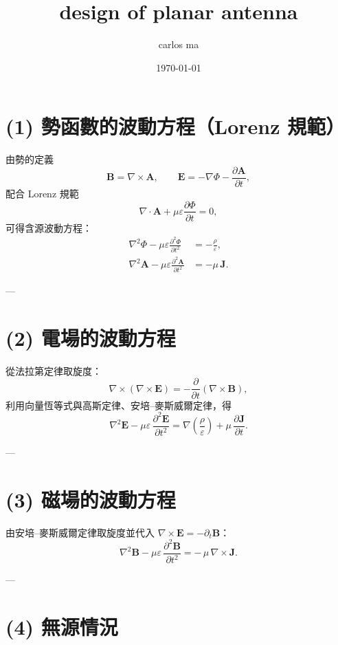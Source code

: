 \documentclass{article}
\title{design of planar antenna}
\author{carlos ma}
\date{\today}
\begin{document}
\maketitle
\section*{(1) 勢函數的波動方程（Lorenz 規範）}

由勢的定義
\[
\mathbf{B}=\nabla\times\mathbf{A},\qquad
\mathbf{E}=-\nabla\Phi-\frac{\partial\mathbf{A}}{\partial t},
\]
配合 Lorenz 規範
\[
\nabla\cdot\mathbf{A}+\mu\varepsilon\frac{\partial\Phi}{\partial t}=0,
\]
可得含源波動方程：
\begin{align}
\nabla^{2}\Phi - \mu\varepsilon \frac{\partial^{2}\Phi}{\partial t^{2}}
&= -\frac{\rho}{\varepsilon}, \label{eq:Phi}\\[6pt]
\nabla^{2}\mathbf{A} - \mu\varepsilon \frac{\partial^{2}\mathbf{A}}{\partial t^{2}}
&= -\mu\,\mathbf{J}. \label{eq:A}
\end{align}

---

\section*{(2) 電場的波動方程}

從法拉第定律取旋度：
\[
\nabla\times(\nabla\times\mathbf{E})
=-\frac{\partial}{\partial t}(\nabla\times\mathbf{B}),
\]
利用向量恆等式與高斯定律、安培–麥斯威爾定律，得
\begin{equation}
\nabla^2 \mathbf{E}-\mu\varepsilon\,\frac{\partial^2 \mathbf{E}}{\partial t^2}
=\nabla\!\left(\frac{\rho}{\varepsilon}\right)+\mu\,\frac{\partial \mathbf{J}}{\partial t}.
\label{eq:Ewave}
\end{equation}

---

\section*{(3) 磁場的波動方程}

由安培–麥斯威爾定律取旋度並代入 \(\nabla\times\mathbf{E}=-\partial_t\mathbf{B}\)：
\begin{equation}
\nabla^2 \mathbf{B}-\mu\varepsilon\,\frac{\partial^2 \mathbf{B}}{\partial t^2}
=-\,\mu\,\nabla\times\mathbf{J}.
\label{eq:Bwave}
\end{equation}

---

\section*{(4) 無源情況}
\end{document}
